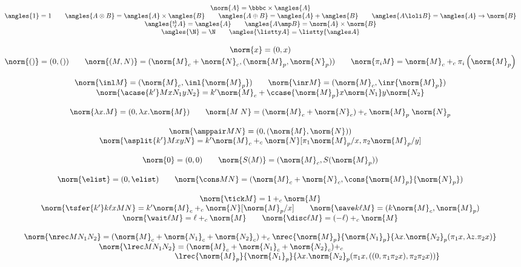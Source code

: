 \begin{small}
\[
\begin{array}{c}
\norm{A} = \bbbc \times \angles{A} \\
\angles{1} = 1 \qquad
\angles{A \otimes B} = \angles{A} \times \angles{B}\qquad
\angles{A \oplus B} = \angles{A} + \angles{B}\qquad
\angles{A \loli B} = \angles{A} \to \norm{B} \\
\angles{!^k_\ell A} = \angles{A} \qquad
\angles{A \amp B} = \norm{A} \times \norm{B} \\
\angles{\N} = \N\qquad
\angles{\listty A} = \listty {\angles A} \\
\end{array}
\]

\[
\begin{array}{c}
\norm{x} = (0,x) \\
\norm{()} = (0,()) \qquad
\norm{(M,N)} = (\norm{M}_c + \norm{N}_c,(\norm{M}_p,\norm{N}_p)) \qquad
\norm{\pi_i M} = \norm{M}_c +_c \pi_i\left(\norm{M}_p\right)\\ \\
\norm{\inl M} = (\norm{M}_c,\inl {\norm{M}_p}) \qquad
\norm{\inr M} = (\norm{M}_c,\inr {\norm{M}_p})\\
\norm{\acase {k'} M x {N_1} y {N_2}} = k'\norm{M}_c + \ccase {\norm{M}_p} x {\norm{N_1}} y {\norm{N_2}}\\ \\
\norm{\lambda x.M} = (0,\lambda x.\norm{M}) \qquad
\norm{M \; N} = (\norm{M}_c + \norm{N}_c) +_c \norm{M}_p \; \norm{N}_p\\ \\
\norm{\amppair M N} = (0,(\norm{M},\norm{N}))\\
\norm{\asplit {k'} M x y N} = k'\norm{M}_c +_c \norm{N}[\pi_1\norm{M}_p/x,\pi_2\norm{M}_p/y]\\ \\
\norm{0} = (0,0) \qquad
\norm{S(M)} = (\norm{M}_c,S(\norm{M}_p)) \\ \\
\norm{\elist} = (0,\elist) \qquad
\norm{\cons M N} = (\norm{M}_c + \norm{N}_c,\cons {\norm{M}_p} {\norm{N}_p}) \\ \\
\norm{\tick M} = 1 +_c \norm{M}\\
\norm{\tsfer {k'} k \ell x M N} = k'\norm{M}_c +_c \norm{N}[\norm{M}_p/x] \qquad
\norm{\save k \ell M} = (k\norm{M}_c,\norm{M}_p)\\
\norm{\wait \ell M} = \ell +_c \norm{M} \qquad
\norm{\disc \ell M} = (-\ell) +_c \norm{M}\\ \\
\norm{\nrec M {N_1} {N_2}} = (\norm{M}_c + \norm{N_1}_c + \norm{N_2}_c) +_c \nrec {\norm{M}_p} {\norm{N_1}_p} {\lambda x. \norm{N_2}_p(\pi_1 x,\lambda z.\pi_2 x)}\\
\hspace{-10em}\norm{\lrec M {N_1} {N_2}}=(\norm{M}_c+\norm{N_1}_c+\norm{N_2}_c)+_c\\
\hspace{12em}\lrec {\norm{M}_p} {\norm{N_1}_p} {\lambda x. \norm{N_2}_p (\pi_1 x,((0,\pi_1 \pi_2 x),\pi_2\pi_2 x)) }\\
\end{array}
\]
\end{small}
